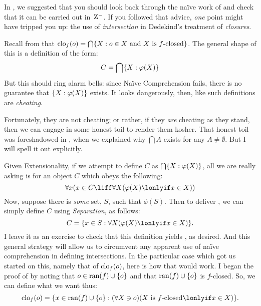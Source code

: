 \documentclass[../../../include/open-logic-section]{subfiles}
\begin{document}

In , we suggested that you should look
back through the na\"ive work of  and check that
it can be carried out in~$\mathrm{Z}^{-}$. If you followed that advice,
\emph{one} point might have tripped you up: the use of
\emph{intersection} in Dedekind's treatment of \emph{closures}. 

Recall from  that
$\mathrm{clo}_{f}(o) = \bigcap\{ X : o \in X \text{ and $X$ is
$f$-closed} \}$. The general shape of this is a definition of the form:
\[
	C = \bigcap\{ X : \varphi(X) \}
\]
But this should ring alarm bells: since Na\"ive Comprehension fails,
there is no guarantee that $\{ X : \varphi(X) \}$ exists. It looks
dangerously, then, like such definitions are \emph{cheating}. 

Fortunately, they are not cheating; or rather, if they \emph{are}
cheating as they stand, then we can engage in some honest toil to
render them kosher. That honest toil was foreshadowed in
, when we explained why
$\bigcap A$ exists for any $A \neq \emptyset$. But I will spell it out
explicitly.

Given Extensionality, if we attempt to define $C$ as
$\bigcap\{ X : \varphi(X) \}$, all we are really asking is for an
object $C$ which obeys the following:
\begin{equation}\ollabel{bicondelimarbintersection}
	\forall x(x \in C \liff \forall X(\phi(X) \lonlyif x \in X))
\end{equation}
Now, suppose there is \emph{some} set, $S$, such that $\phi(S)$. Then
to deliver , we can simply define $C$
using \emph{Separation}, as follows:
\[
	C = \Setabs{x \in S}{\forall X(\phi(X) \lonlyif x \in X)}.
\]
I leave it as an exercise to check that this definition yields
, as desired. 
And this general strategy will allow us to circumvent any apparent use of na\"ive comprehension in defining intersections. In the particular case which got us started on this, namely that of $\mathrm{clo}_{f}(o)$, here is how that would work. I began the proof of  by noting that $o \in \mathrm{ran}(f)\cup\{o\}$ and that $\mathrm{ran}(f) \cup \{o\}$ is $f$-closed. So, we can define what we want thus:
\[
	\closureofunder{f}{o} = \Setabs{x \in \ran{f} \cup \{o\}}{(\forall X \ni o)(X \text{ is $f$-closed} \lonlyif x \in X)}.
\]
\end{document}
